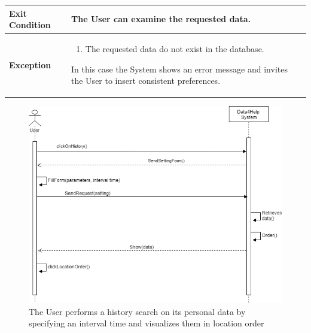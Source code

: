 \begin{table}[H]
\begin{tabular}{|p{3.5cm}|p{10.3cm}|}
    \hline
    
    \textbf{\large{Exit Condition}} 	& The User can examine the requested data. \\
    
    \hline
    
    \textbf{\large{Exception}} 			& \begin{enumerate}[leftmargin=0.5cm]                                           \item The requested data do not                                         exist in the database. 
                                        \end{enumerate}
                                        In this case the System shows an error message and invites the User to insert consistent preferences.\\
    
    \hline
    
    \end{tabular}
	
\end{table}
\begin{figure}[H]
    \centering
    \includegraphics[scale=0.4]{./Pictures/history.png}
     \caption{The User performs a history search on its personal data by specifying an interval time and visualizes them in location order}
    
\end{figure}
